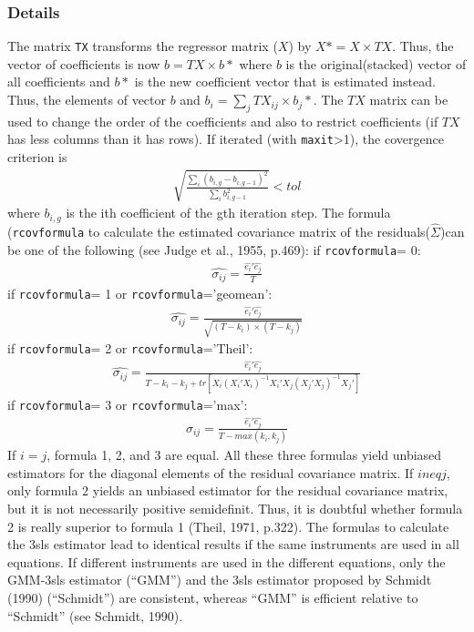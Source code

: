 \subsubsection{Details}
The matrix \texttt{TX} transforms the regressor matrix ($X$) by $X\ast=X \times TX$. Thus,
the vector of coefficients is now $b=TX \times b\ast$ where $b$ is the original(stacked) 
vector of all coefficients and $b\ast$ is the new coefficient vector that is estimated instead.
Thus, the elements of vector $b$ and $b_i = \sum_j TX_{ij}\times b_j\ast$. The $TX$ matrix can be
used to change the order of the coefficients and also to restrict coefficients (if $TX$ has 
less columns than it has rows). 
If iterated (with \texttt{maxit}>1), the covergence criterion is
\begin{eqnarray*}
\sqrt{\frac{\sum_i(b_{i,g}-b_{i,g-1})^2}{\sum_ib_{i,g-1}^2}} < tol
\end{eqnarray*}
where $b_{i,g}$ is the ith coefficient of the gth iteration step.
The formula (\texttt{rcovformula} to calculate the estimated covariance matrix of the residuals($\hat{\Sigma}$)can be one
of the following (see Judge et al., 1955, p.469):
if \texttt{rcovformula}= 0:
\begin{eqnarray*}
\hat{\sigma_{ij}}= \frac{\hat{e_i}\prime\hat{e_j}}{T}
\end{eqnarray*}
if \texttt{rcovformula}= 1 or \texttt{rcovformula}='geomean':
\begin{eqnarray*}
\hat{\sigma_{ij}}= \frac{\hat{e_i}\prime\hat{e_j}}{\sqrt{(T-k_i)\times (T-k_j)}}
\end{eqnarray*}
if \texttt{rcovformula}= 2 or \texttt{rcovformula}='Theil':
\begin{eqnarray*}
\hat{\sigma_{ij}}= \frac{\hat{e_i}\prime\hat{e_j}}{T-k_i-k_j+tr[X_i(X_i\prime X_i)^{-1}X_i\prime X_j(X_j\prime X_j)^{-1}X_j\prime]}
\end{eqnarray*}
if \texttt{rcovformula}= 3 or \texttt{rcovformula}='max':
\begin{eqnarray*}
\hat{\sigma_{ij}}= \frac{\hat{e_i}\prime\hat{e_j}}{T-max(k_i,k_j)}
\end{eqnarray*}
If $i = j$, formula 1, 2, and 3 are equal. All these three formulas yield unbiased estimators
for the diagonal elements of the residual covariance matrix. If $i neq j$, only formula 2
yields an unbiased estimator for the residual covariance matrix, but it is not necessarily
positive semidefinit. Thus, it is doubtful whether formula 2 is really superior to formula 1
(Theil, 1971, p.322).
The formulas to calculate the 3sls estimator lead to identical results 
if the same instruments are used in all equations. If different instruments 
are used in the different equations, only the GMM-3sls estimator (``GMM'') 
and the 3sls estimator proposed by Schmidt (1990) (``Schmidt'') are consistent, whereas 
``GMM'' is efficient relative to ``Schmidt'' (see Schmidt, 1990).
